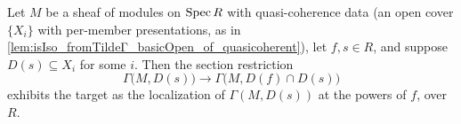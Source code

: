 \begin{lemma}
  \label{lem:section_localization_hfr_basicOpen}
  \leanok
  Let \(M\) be a sheaf of modules on \(\operatorname{Spec} R\) with quasi-coherence data (an open cover
  \(\{X_i\}\) with per-member presentations, as in
  \cref{lem:isIso_fromTildeΓ_basicOpen_of_quasicoherent}), let \(f, s \in R\), and
  suppose \(D(s) \subseteq X_i\) for some \(i\). Then the section restriction
  \[
    \Gamma\bigl(M, D(s)\bigr) \longrightarrow \Gamma\bigl(M, D(f) \cap D(s)\bigr)
  \]
  exhibits the target as the localization of \(\Gamma(M, D(s))\) at the powers of \(f\),
  over \(R\).
\end{lemma}
